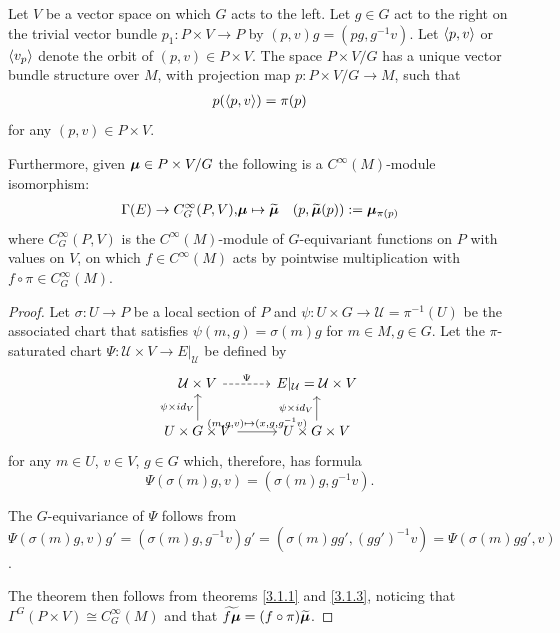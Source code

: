 
\begin{proposition} \label{propAssociatedExists}
    Let $V$ be a vector space on which $G$ acts to the left. Let $g \in G$ act to the right on the trivial vector bundle $p_1 :P \times V \to P$ by $(p, v)g = (pg, g^{-1}v)$. Let $\left\langle p, v \right\rangle$ or $\left\langle v_p \right\rangle$ denote the orbit of $(p, v) \in P \times V$. The space $P \times V/G$ has a unique vector bundle structure over $M$, with projection map $p: P \times V / G \to M$, such that \begin{align}
        p(\left\langle p, v \right\rangle) = \pi(p)
    \end{align} for any $(p, v) \in P \times V$.
    
    Furthermore, given $\bm{\mu} \in P \times V/G$ the following is a $C^\infty(M)$-module isomorphism: 
    \begin{align}\label{defnTilde}
        \Gamma(E) \to C^\infty_G(P, V), & \bm{\mu} \mapsto \widetilde{\bm{\mu}} & (p, \widetilde{\bm{\mu}}(p)) := \bm{\mu}_{\pi(p)}
    \end{align}
     where $C^\infty_G(P, V)$ is the $C^\infty(M)$-module of $G$-equivariant functions on $P$ with values on $V$, on which $f \in C^\infty(M)$ acts by pointwise multiplication with $f \circ \pi \in C^\infty_G(M)$. 
\end{proposition}

\begin{proof}
Let $\sigma: U \to P$ be a local section of $P$ and $\psi: U \times G \to \mathcal U = \pi^{-1}(U)$ be the associated chart that satisfies $\psi(m, g) = \sigma(m)g$ for $m \in M, g \in G$. Let the $\pi$-saturated chart $\Psi: \mathcal U \times V \to E|_{\mathcal U}$ be defined by
\begin{equation*}
    \begin{tikzcd}
        \mathcal U \times V \arrow[dashed]{r}{\Psi} & E|_{\mathcal U} = \mathcal U \times V \\
        U \times G \times V \arrow{u}{\psi \times id_V} \arrow{r}{(m, g, v) \mapsto (x, g, g^{-1}v)}    & U \times G \times V \arrow{u}{\psi \times id_V}
    \end{tikzcd}
\end{equation*}
for any $m \in U$, $v \in V$, $g \in G$ which, therefore, has formula
\[
    \Psi(\sigma(m)g, v) = (\sigma(m)g, g^{-1}v).
\]

The $G$-equivariance of $\Psi$ follows from $\Psi(\sigma(m)g, v)g' = (\sigma(m)g, g^{-1}v)g' = (\sigma(m)gg', (gg')^{-1}v) = \Psi(\sigma(m)gg', v)$.

The theorem then follows from theorems \ref{3.1.1} and \ref{3.1.3}, noticing that $\Gamma^G(P \times V) \cong C^\infty_G(M)$ and that $\widetilde{f \bm{\mu}} = (f \circ \pi) \widetilde{\bm{\mu}}$.
\end{proof}

